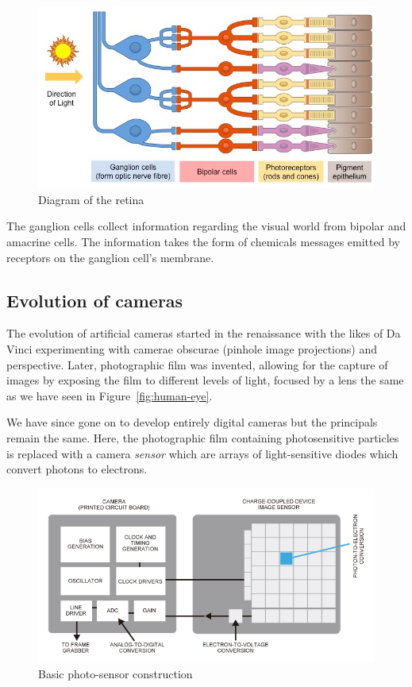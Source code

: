 \documentclass{article}
\begin{document}
\begin{figure}[ht]
  \centering
  \includegraphics[scale=0.3]{figures/retina_med.jpeg}
  \caption{\label{fig:retina} Diagram of the retina}
\end{figure}

The ganglion cells collect information regarding the visual world from bipolar and amacrine cells. The information takes the form of chemicals messages emitted by receptors on the ganglion cell's membrane.

\subsection{Evolution of cameras}

The evolution of artificial cameras started in the renaissance with the likes of Da Vinci experimenting with camerae obscurae (pinhole image projections) and perspective. Later, photographic film was invented, allowing for the capture of images by exposing the film to different levels of light, focused by a lens the same as we have seen in Figure~\ref{fig:human-eye}.

We have since gone on to develop entirely digital cameras but the principals remain the same. Here, the photographic film containing photosensitive particles is replaced with a camera \textit{sensor} which are arrays of light-sensitive diodes which convert photons to electrons.

\begin{figure}[ht]
  \centering
  \includegraphics[scale=0.3]{figures/digital-sensor.jpg}
  \caption{\label{fig:digital-sensor} Basic photo-sensor construction }
\end{figure}
\end{document}
